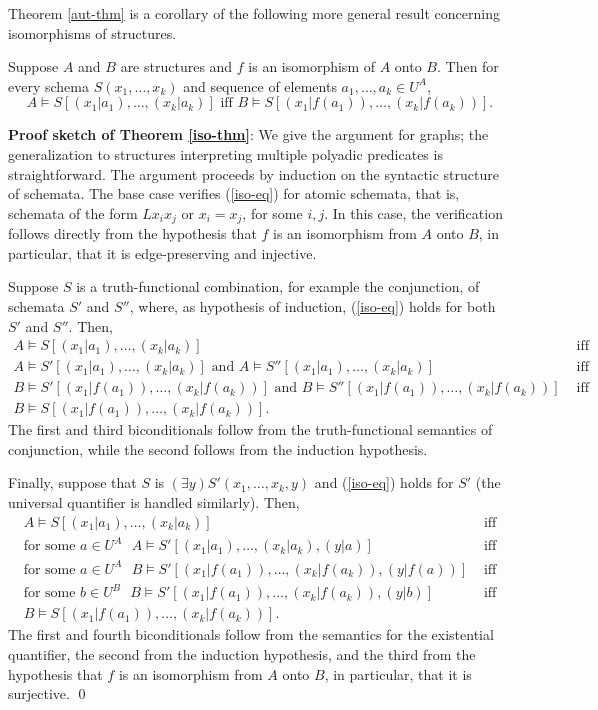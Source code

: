 Theorem \ref{aut-thm} is a corollary of the following more general result concerning isomorphisms of structures.
\begin{theorem}\label{iso-thm}
Suppose $A$ and $B$ are structures and $f$ is an isomorphism of $A$ onto $B$. Then for every schema $S(x_1,\ldots,x_k)$ and sequence of elements $a_1,\dots,a_k\in U^A$,
\begin{equation}\label{iso-eq}
A\models S[(x_1|a_1),\ldots,(x_k|a_k)]\mbox{ iff }B\models S[(x_1|f(a_1)),\ldots,(x_k|f(a_k))].
\end{equation}
\end{theorem}

{\bf Proof sketch of Theorem \ref{iso-thm}}:
We give the argument for graphs; the generalization to structures interpreting multiple polyadic predicates is straightforward.
The argument proceeds by induction on the syntactic structure of schemata. The base case verifies (\ref{iso-eq}) for atomic schemata, that is, schemata of the form $Lx_ix_j$ or $x_i=x_j$, for some $i,j$. In this case, the verification follows directly from the hypothesis that $f$ is an isomorphism from $A$ onto $B$, in particular, that it is edge-preserving and injective.

Suppose $S$ is a truth-functional combination, for example the conjunction, of schemata $S'$ and $S''$, where, as hypothesis of induction, (\ref{iso-eq}) holds for both $S'$ and $S''$. Then,
\[
\begin{array}{lc}
A\models S[(x_1|a_1),\ldots,(x_k|a_k)] & \mbox{ iff}\\
A\models S'[(x_1|a_1),\ldots,(x_k|a_k)]\mbox{ and }A\models S''[(x_1|a_1),\ldots,(x_k|a_k)] & \mbox{ iff}\\
B\models S'[(x_1|f(a_1)),\ldots,(x_k|f(a_k))]\mbox{ and }B\models S''[(x_1|f(a_1)),\ldots,(x_k|f(a_k))] & \mbox{ iff}\\
B\models S[(x_1|f(a_1)),\ldots,(x_k|f(a_k))].
\end{array}
\]
The first and third biconditionals follow from the truth-functional semantics of conjunction, while the second follows from the induction hypothesis.

Finally, suppose that $S$ is $(\exists y)S'(x_1,\ldots,x_k,y)$ and (\ref{iso-eq}) holds for $S'$ (the universal quantifier is handled similarly). Then,
\[
\begin{array}{lc}
A\models S[(x_1|a_1),\ldots,(x_k|a_k)] & \mbox{ iff}\\
\mbox{for some $a\in U^A$ }
A\models S'[(x_1|a_1),\ldots,(x_k|a_k),(y|a)] & \mbox{ iff}\\
\mbox{for some $a\in U^A$ }
B\models S'[(x_1|f(a_1)),\ldots,(x_k|f(a_k)),(y|f(a))] & \mbox{ iff}\\
\mbox{for some $b\in U^B$ }
B\models S'[(x_1|f(a_1)),\ldots,(x_k|f(a_k)),(y|b)] & \mbox{ iff}\\
B\models S[(x_1|f(a_1)),\ldots,(x_k|f(a_k))].
\end{array}
\]
The first and fourth biconditionals follow from the semantics for the existential quantifier, the second from the induction hypothesis, and the third from the hypothesis that $f$ is an isomorphism from $A$ onto $B$, in particular, that it is
surjective. \qed 

